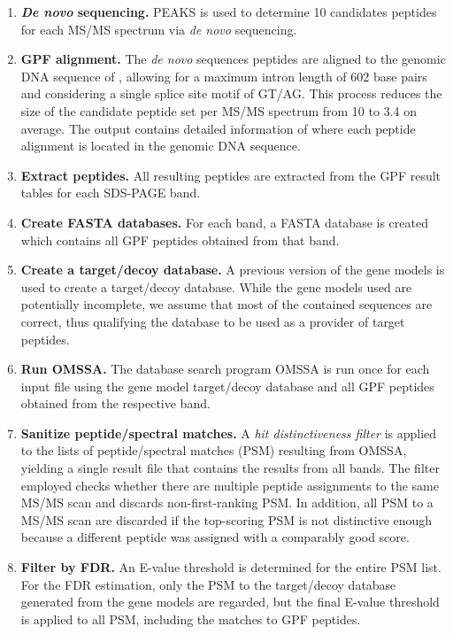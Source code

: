 \begin{enumerate}

\item {\bf {\em De novo} sequencing.} 
PEAKS is used to determine 10 candidates peptides for each MS/MS spectrum
via {\em de novo} sequencing.

\item {\bf GPF alignment.} 
The {\em de novo} sequences peptides are aligned to the genomic DNA sequence 
of \cre, allowing for a maximum intron length of 602 base pairs and considering 
a single splice site motif of GT/AG. 
This process reduces the size of the candidate peptide set per MS/MS spectrum 
from 10 to 3.4 on average.
The output contains detailed information of where each peptide alignment
is located in the genomic DNA sequence.

\item {\bf Extract peptides.}
All resulting peptides are extracted from the GPF result tables for each 
SDS-PAGE band.

\item {\bf Create FASTA databases.}
For each band, a FASTA database is created which contains all GPF peptides 
obtained from that band.

\item {\bf Create a target/decoy database.} 
A previous version of the gene models is used to create a target/decoy database.
While the gene models used are potentially incomplete, we assume that most
of the contained sequences are correct, thus qualifying the database to be
used as a provider of target peptides.

\item {\bf Run OMSSA.} 
The database search program OMSSA is run once for each input file using
the gene model target/decoy database and all GPF peptides obtained from
the respective band.

\item {\bf Sanitize peptide/spectral matches.} 
A {\em hit distinctiveness filter} is applied to the lists of peptide/spectral
matches (PSM) resulting from OMSSA, yielding a single result file that contains
the results from all bands.
The filter employed checks whether there are multiple peptide assignments
to the same MS/MS scan and discards non-first-ranking PSM.
In addition, all PSM to a MS/MS scan are discarded if the top-scoring PSM
is not distinctive enough because a different peptide was assigned with a 
comparably good score.

\item {\bf Filter by FDR.} 
An E-value threshold is determined for the entire PSM list.
For the FDR estimation, only the PSM to the target/decoy database generated
from the gene models are regarded, but the final E-value threshold is applied
to all PSM, including the matches to GPF peptides.


\end{enumerate}
